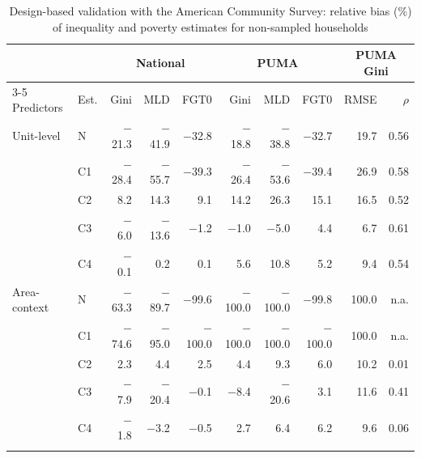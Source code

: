 \begin{table}[ht]
\caption{Design-based validation with the American Community Survey: relative bias (\%) of inequality and poverty estimates for non-sampled households}\label{tab:acs}%
\begin{tabular*}{\textwidth}{@{\extracolsep\fill}llrrrrrrrr@{}}
\toprule
 & & \multicolumn{3}{c}{National} & \multicolumn{3}{c}{PUMA} & \multicolumn{2}{c}{PUMA Gini}\\
\cmidrule{3-5}\cmidrule{6-8}\cmidrule{9-10}
Predictors & Est. & Gini & MLD & FGT0 & Gini & MLD & FGT0 & RMSE & $\rho$\\
\midrule
Unit-level & N & $-$21.3 & $-$41.9 & $-$32.8 & $-$18.8 & $-$38.8 & $-$32.7 & 19.7 & 0.56 \\
 & C1 & $-$28.4 & $-$55.7 & $-$39.3 & $-$26.4 & $-$53.6 & $-$39.4 & 26.9 & 0.58 \\
 & C2 & 8.2 & 14.3 & 9.1 & 14.2 & 26.3 & 15.1 & 16.5 & 0.52 \\
 & C3 & $-$6.0 & $-$13.6 & $-$1.2 & $-$1.0 & $-$5.0 & 4.4 & 6.7 & 0.61 \\
 & C4 & $-$0.1 & 0.2 & 0.1 & 5.6 & 10.8 & 5.2 & 9.4 & 0.54 \\
\midrule
Area-context & N & $-$63.3 & $-$89.7 & $-$99.6 & $-$100.0 & $-$100.0 & $-$99.8 & 100.0 & n.a. \\
 & C1 & $-$74.6 & $-$95.0 & $-$100.0 & $-$100.0 & $-$100.0 & $-$100.0 & 100.0 & n.a. \\
 & C2 & 2.3 & 4.4 & 2.5 & 4.4 & 9.3 & 6.0 & 10.2 & 0.01 \\
 & C3 & $-$7.9 & $-$20.4 & $-$0.1 & $-$8.4 & $-$20.6 & 3.1 & 11.6 & 0.41 \\
 & C4 & $-$1.8 & $-$3.2 & $-$0.5 & 2.7 & 6.4 & 6.2 & 9.6 & 0.06 \\
\botrule
\end{tabular*}
\end{table}

